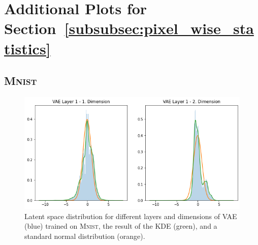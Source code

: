 \documentclass[11pt,a4paper]{article}
\let\oldsection\section
\renewcommand\section{\clearpage\oldsection}
\begin{document}
\pagebreak
\section{Additional Plots for Section~\ref{subsubsec:pixel_wise_statistics}}\label{sec:appendix_pixel_wise_statistics}
\subsection{\textsc{Mnist}}\label{subsec:appendix_pixel_wise_statistics_mnist}
\begin{figure}[H]
\centering
\includegraphics[width=\textwidth]{images/generated_vs_true/mnist/vae_kde.png}
\caption[\ac{VAE} on \textsc{Mnist}: Estimated Latent Space Distribution]{Latent space distribution for different layers and dimensions of \ac{VAE} (blue) trained on \textsc{Mnist}, the result of the \ac{KDE} (green), and a standard normal distribution (orange).}
\end{figure}
\end{document}
